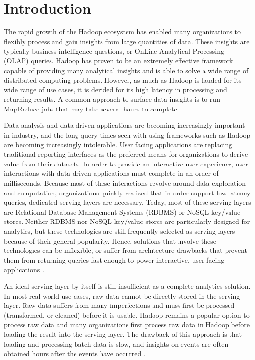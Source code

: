 \documentclass{vldb}
\begin{document}
\section{Introduction}
The rapid growth of the Hadoop\cite{shvachko2010hadoop} ecosystem has enabled
many organizations to flexibly process and gain insights from large quantities
of data. These insights are typically business intelligence questions, or
OnLine Analytical Processing (OLAP) queries. Hadoop has proven to be an
extremely effective framework capable of providing many analytical insights and
is able to solve a wide range of distributed computing problems. However, as
much as Hadoop is lauded for its wide range of use cases, it is derided for its
high latency in processing and returning results. A common approach to surface
data insights is to run MapReduce jobs that may take several hours to complete.

Data analysis and data-driven applications are becoming increasingly important
in industry, and the long query times seen with using frameworks such as Hadoop
are becoming increasingly intolerable. User facing applications are replacing
traditional reporting interfaces as the preferred means for organizations to
derive value from their datasets. In order to provide an interactive user
experience, user interactions with data-driven applications must complete in an
order of milliseconds. Because most of these interactions revolve around data
exploration and computation, organizations quickly realized that in order
support low latency queries, dedicated serving layers are necessary. Today,
most of these serving layers are Relational Database Management Systems (RDBMS)
or NoSQL key/value stores. Neither RDBMS nor NoSQL key/value stores are
particularly designed for analytics, but these technologies are still
frequently selected as serving layers because of their general popularity.
Hence, solutions that involve these technologies can be inflexible, or suffer
from architecture drawbacks that prevent them from returning queries fast
enough to power interactive, user-facing applications
\cite{tschetter2011druid}.

An ideal serving layer by itself is still insufficient as a complete analytics
solution. In most real-world use cases, raw data cannot be directly stored in
the serving layer. Raw data suffers from many imperfections and must first be
processed (transformed, or cleaned) before it is usable. Hadoop remains a
popular option to process raw data and many organizations first process raw
data in Hadoop before loading the result into the serving layer. The drawback
of this approach is that loading and processing batch data is slow, and
insights on events are often obtained hours after the events have occurred
\cite{yang2014radstack}.
\end{document}
